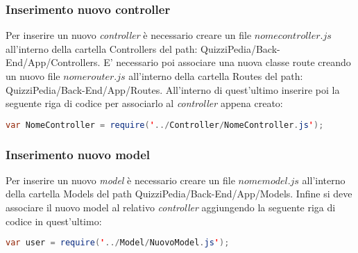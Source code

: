\subsubsection{Inserimento nuovo controller}
Per inserire un nuovo \textit{controller} è necessario creare un file $nomecontroller.js$ all'interno della cartella Controllers del path: QuizziPedia/Back-End/App/Controllers. E' necessario poi associare una nuova classe route creando un nuovo file $nomerouter.js$ all'interno della cartella Routes del path: QuizziPedia/Back-End/App/Routes. All'interno di quest'ultimo inserire poi la seguente riga di codice per associarlo al \textit{controller} appena creato:
\begin{lstlisting}[language=Java,firstnumber=1]
var NomeController = require('../Controller/NomeController.js');
\end{lstlisting}

\subsubsection{Inserimento nuovo model}
Per inserire un nuovo \textit{model} è necessario creare un file $nomemodel.js$ all'interno della cartella Models del path QuizziPedia/Back-End/App/Models. Infine si deve associare il nuovo model al relativo \textit{controller} aggiungendo la seguente riga di codice in quest'ultimo:
\begin{lstlisting}[language=Java,firstnumber=1]
var user = require('../Model/NuovoModel.js');
\end{lstlisting}